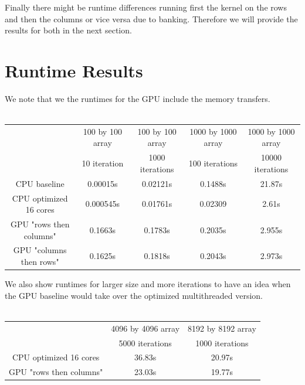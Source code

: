 \documentclass{article}
\begin{document}
Finally there might be runtime differences running first the kernel on the rows and then the columns or vice versa due to banking. Therefore we will provide the results for both in the next section.

\section{Runtime Results}
We note that we the runtimes for the GPU include the memory transfers. \\ \\
\begin{tabular}{|c|c|c|c|c|}
\hline
 & 100 by 100 array & 100 by 100 array & 1000 by 1000 array & 1000 by 1000 array \\
 & 10 iteration & 1000 iterations & 100 iterations & 10000 iterations \\
 \hline
 CPU baseline & 0.00015s & 0.02121s & 0.1488s & 21.87s \\
 \hline
 CPU optimized 16 cores & 0.000545s & 0.01761s & 0.02309 & 2.61s \\
 \hline
 GPU "rows then columns" & 0.1663s & 0.1783s & 0.2035s & 2.955s  \\
 \hline
 GPU "columns then rows" & 0.1625s & 0.1818s & 0.2043s & 2.973s \\
\hline
\end{tabular}
\newpage
We also show runtimes for larger size and more iterations to have an idea when the GPU baseline would take over the optimized multithreaded version. \\ \\
\begin{tabular}{|c|c|c|}
\hline
& 4096 by 4096 array & 8192 by 8192 array \\
& 5000 iterations & 1000 iterations \\
\hline
CPU optimized 16 cores & 36.83s & 20.97s \\
\hline
GPU "rows then columns" & 23.03s & 19.77s \\
\hline
\end{tabular}
\end{document}

